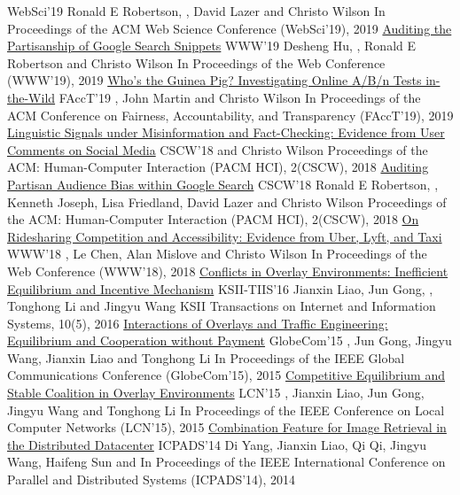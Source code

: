 \documentclass[letterpaper]{awesome-cv}
\begin{document}
\begin{cventries}
    {WebSci'19}
    {Ronald E Robertson, , David Lazer and Christo Wilson}
    {In Proceedings of the ACM Web Science Conference (WebSci’19), 2019}
  \cvpubadmin
    {\href{https://shanjiang.me/publications/www19_paper.pdf}{Auditing the Partisanship of Google Search Snippets}}
    {WWW'19}
    {Desheng Hu, , Ronald E Robertson and Christo Wilson}
    {In Proceedings of the Web Conference (WWW’19), 2019}
  \cvpubadmin
    {\href{https://shanjiang.me/publications/facct19_paper.pdf}{Who's the Guinea Pig? Investigating Online A/B/n Tests in-the-Wild}}
    {FAccT'19}
    {, John Martin and Christo Wilson}
    {In Proceedings of the ACM Conference on Fairness, Accountability, and Transparency (FAccT’19), 2019}
  \cvpubadmin
    {\href{https://shanjiang.me/publications/cscw18a_paper.pdf}{Linguistic Signals under Misinformation and Fact-Checking: Evidence from User Comments on Social Media}}
    {CSCW'18}
    { and Christo Wilson}
    {Proceedings of the ACM: Human-Computer Interaction (PACM HCI), 2(CSCW), 2018}
  \cvpubadmin
    {\href{https://shanjiang.me/publications/cscw18b_paper.pdf}{Auditing Partisan Audience Bias within Google Search}}
    {CSCW'18}
    {Ronald E Robertson, , Kenneth Joseph, Lisa Friedland, David Lazer and Christo Wilson}
    {Proceedings of the ACM: Human-Computer Interaction (PACM HCI), 2(CSCW), 2018}
  \cvpubadmin
    {\href{https://shanjiang.me/publications/www18_paper.pdf}{On Ridesharing Competition and Accessibility: Evidence from Uber, Lyft, and Taxi}}
    {WWW'18}
    {, Le Chen, Alan Mislove and Christo Wilson}
    {In Proceedings of the Web Conference (WWW’18), 2018}
  \cvpubadmin
    {\href{https://shanjiang.me/publications/tiis16_paper.pdf}{Conflicts in Overlay Environments: Inefficient Equilibrium and Incentive Mechanism}}
    {KSII-TIIS'16}
    {Jianxin Liao, Jun Gong, , Tonghong Li and Jingyu Wang}
    {KSII Transactions on Internet and Information Systems, 10(5), 2016}
  \cvpubadmin
    {\href{https://shanjiang.me/publications/globecom15_paper.pdf}{Interactions of Overlays and Traffic Engineering: Equilibrium and Cooperation without Payment}}
    {GlobeCom'15}
    {, Jun Gong, Jingyu Wang, Jianxin Liao and Tonghong Li}
    {In Proceedings of the IEEE Global Communications Conference (GlobeCom’15), 2015}
  \cvpubadmin
    {\href{https://shanjiang.me/publications/lcn15_paper.pdf}{Competitive Equilibrium and Stable Coalition in Overlay Environments}}
    {LCN'15}
    {, Jianxin Liao, Jun Gong, Jingyu Wang and Tonghong Li}
    {In Proceedings of the IEEE Conference on Local Computer Networks (LCN’15), 2015}
  \cvpubadmin
    {\href{https://shanjiang.me/publications/icpads14_paper.pdf}{Combination Feature for Image Retrieval in the Distributed Datacenter}}
    {ICPADS'14}
    {Di Yang, Jianxin Liao, Qi Qi, Jingyu Wang, Haifeng Sun and }
    {In Proceedings of the IEEE International Conference on Parallel and Distributed Systems (ICPADS’14), 2014}
\end{cventries}
\end{document}
